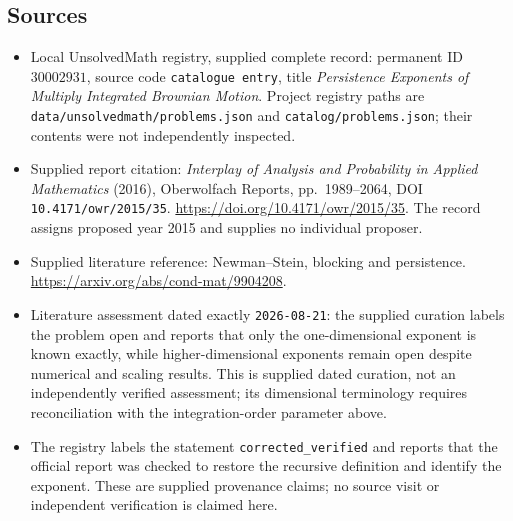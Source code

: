 \documentclass[11pt]{article}
\begin{document}
\subsection{Sources}
\begin{itemize}
\item Local UnsolvedMath registry, supplied complete record: permanent ID \(30002931\), source code \texttt{catalogue entry}, title \emph{Persistence Exponents of Multiply Integrated Brownian Motion}. Project registry paths are \texttt{data/unsolvedmath/problems.json} and \texttt{catalog/problems.json}; their contents were not independently inspected.
\item Supplied report citation: \emph{Interplay of Analysis and Probability in Applied Mathematics} (2016), Oberwolfach Reports, pp.~1989--2064, DOI \texttt{10.4171/owr/2015/35}. \url{https://doi.org/10.4171/owr/2015/35}. The record assigns proposed year 2015 and supplies no individual proposer.
\item Supplied literature reference: Newman--Stein, blocking and persistence. \url{https://arxiv.org/abs/cond-mat/9904208}.
\item Literature assessment dated exactly \texttt{2026-08-21}: the supplied curation labels the problem open and reports that only the one-dimensional exponent is known exactly, while higher-dimensional exponents remain open despite numerical and scaling results. This is supplied dated curation, not an independently verified assessment; its dimensional terminology requires reconciliation with the integration-order parameter above.
\item The registry labels the statement \texttt{corrected\_verified} and reports that the official report was checked to restore the recursive definition and identify the exponent. These are supplied provenance claims; no source visit or independent verification is claimed here.
\end{itemize}
\end{document}
